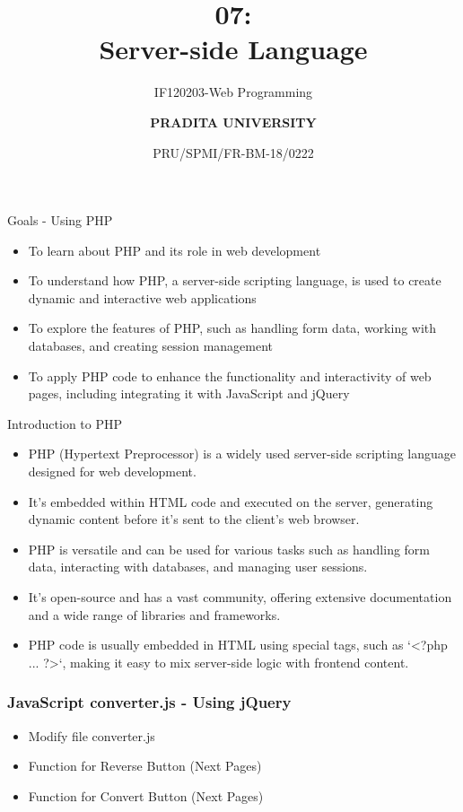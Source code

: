 \documentclass[aspectratio=169, table]{beamer}
\subtitle{IF120203-Web Programming}
\title{\Huge {\textbf{07: \\Server-side Language}}}
\date[Serial]{\scriptsize {PRU/SPMI/FR-BM-18/0222}}
\author[Pradita]{\small {\textbf{PRADITA UNIVERSITY}}}
\begin{document}
\begin{frame}
    \titlepage
\end{frame}

\begin{frame}{Goals - Using PHP}
    \vskip-1cm
    \begin{itemize}
        \item To learn about PHP and its role in web development
        \item To understand how PHP, a server-side scripting language, is used to create dynamic and interactive web applications
        \item To explore the features of PHP, such as handling form data, working with databases, and creating session management
        \item To apply PHP code to enhance the functionality and interactivity of web pages, including integrating it with JavaScript and jQuery
    \end{itemize}
\end{frame}


\begin{frame}{Introduction to PHP}
    \vskip-0.5cm
    \begin{itemize}
        \item PHP (Hypertext Preprocessor) is a widely used server-side scripting language designed for web development.
        \item It's embedded within HTML code and executed on the server, generating dynamic content before it's sent to the client's web browser.
        \item PHP is versatile and can be used for various tasks such as handling form data, interacting with databases, and managing user sessions.
        \item It's open-source and has a vast community, offering extensive documentation and a wide range of libraries and frameworks.
        \item PHP code is usually embedded in HTML using special tags, such as `<?php ... ?>`, making it easy to mix server-side logic with frontend content.
    \end{itemize}
\end{frame}



\begin{frame}[fragile]
    \frametitle{JavaScript converter.js - Using jQuery}
    \begin{itemize}
        \item Modify file converter.js
        \item Function for Reverse Button (Next Pages)
        \item Function for Convert Button (Next Pages)
    \end{itemize}
\end{frame}
\end{document}
